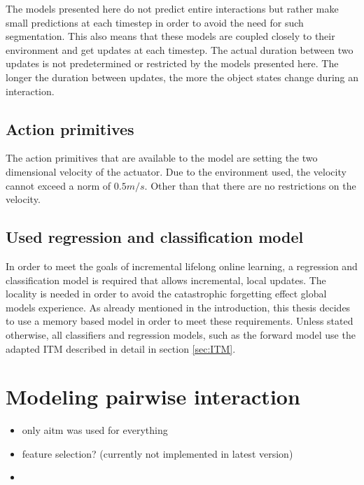 The models presented here do not predict entire interactions but rather make small predictions at each timestep in order to avoid the need for such segmentation. This also means that these models are coupled closely to their environment and get updates at each timestep. The actual duration between two updates is not predetermined or restricted by the models presented here. The longer the duration between updates, the more the object states change during an interaction. 

\subsection{Action primitives}
The action primitives that are available to the model are setting the  two dimensional velocity of the actuator. Due to the environment used, the velocity cannot exceed a norm of $0.5m/s$. Other than that there are no restrictions on the velocity. 


\subsection{Used regression and classification model}

In order to meet the goals of incremental lifelong online learning, a regression and classification model is required that allows incremental, local updates. The locality is needed in order to avoid the catastrophic forgetting effect global models experience. As already mentioned in the introduction, this thesis decides to use a memory based model in order to meet these requirements. Unless stated otherwise, all classifiers and regression models, such as the forward model use the adapted ITM described in detail in section \ref{sec:ITM}.


\section{Modeling pairwise interaction \label{sec:pairRealization}}

\begin{itemize}
	\item only \gls{aitm} was used for everything
	\item feature selection? (currently not implemented in latest version)
	\item 
\end{itemize}


